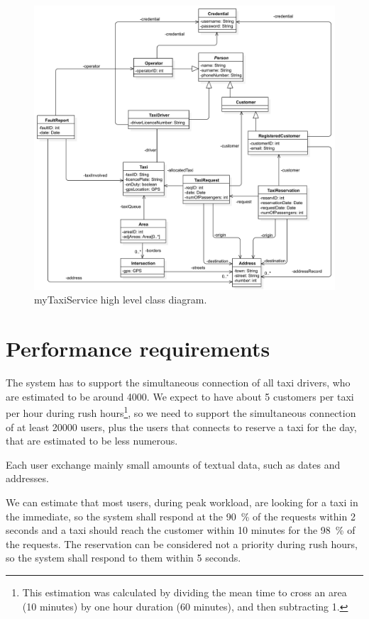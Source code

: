 \begin{figure}
	\includegraphics[width=\textwidth]{img/C_ClassDiagram.pdf}
	\caption{myTaxiService high level class diagram.}
	\label{fig:classdiag}
\end{figure}


\section{Performance requirements}
The system has to support the simultaneous connection of all taxi drivers, who are estimated to be around \num{4000}. We expect to have about \num{5} customers per taxi per hour during rush hours\footnote{This estimation was calculated by dividing the mean time to cross an area (\num{10} minutes) by one hour duration (\num{60} minutes), and then subtracting \num{1}.}, so we need to support the simultaneous connection of at least \num{20000} users, plus the users that connects to reserve a taxi for the day, that are estimated to be less numerous.

Each user exchange mainly small amounts of textual data, such as dates and addresses.

We can estimate that most users, during peak workload, are looking for a taxi in the immediate, so the system shall respond at the \SI{90}{\percent} of the requests within \num{2} seconds and a taxi should reach the customer within \num{10} minutes for the \SI{98}{\percent} of the requests. The reservation can be considered not a priority during rush hours, so the system shall respond to them within \num{5} seconds.

